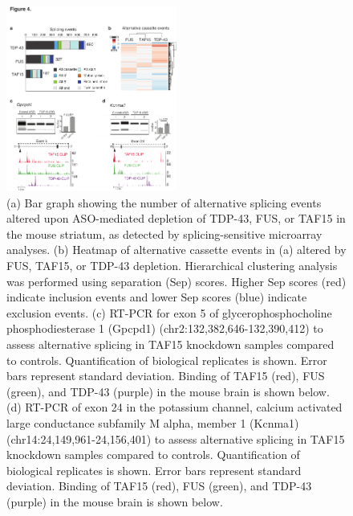 \begin{figure}[ht]
  \centering
  \includegraphics[width=0.5\textwidth]{chapter_2_figures/Figure_4}
  \caption[Figure 4. TAF15 influences alternative splicing for a small subset of transcripts]{(a) Bar graph showing the number of alternative splicing events altered upon ASO-mediated depletion of TDP-43, FUS, or TAF15 in the mouse striatum, as detected by splicing-sensitive microarray analyses. (b) Heatmap of alternative cassette events in (a) altered by FUS, TAF15, or TDP-43 depletion. Hierarchical clustering analysis was performed using separation (Sep) scores. Higher Sep scores (red) indicate inclusion events and lower Sep scores (blue) indicate exclusion events. (c) RT-PCR for exon 5 of glycerophosphocholine phosphodiesterase 1 (Gpcpd1) (chr2:132,382,646-132,390,412) to assess alternative splicing in TAF15 knockdown samples compared to controls. Quantification of biological replicates is shown. Error bars represent standard deviation. Binding of TAF15 (red), FUS (green), and TDP-43 (purple) in the mouse brain is shown below. (d) RT-PCR of exon 24 in the potassium channel, calcium activated large conductance subfamily M alpha, member 1 (Kcnma1) (chr14:24,149,961-24,156,401) to assess alternative splicing in TAF15 knockdown samples compared to controls. Quantification of biological replicates is shown. Error bars represent standard deviation. Binding of TAF15 (red), FUS (green), and TDP-43 (purple) in the mouse brain is shown below.}
  \label{fig:Figure_4}
\end{figure}

